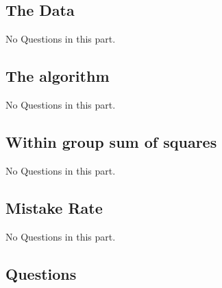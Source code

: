 \documentclass[letterpaper]{article}
\begin{document}
\subsection{The Data}
No Questions in this part.

\subsection{The algorithm}
No Questions in this part.

\subsection{Within group sum of squares}
No Questions in this part.

\subsection{Mistake Rate}
No Questions in this part.

\subsection{Questions}
\end{document}
